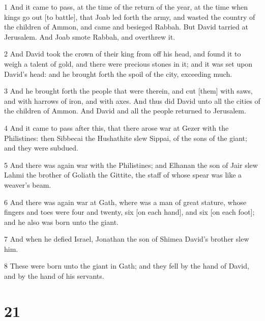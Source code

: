 \par 1 And it came to pass, at the time of the return of the year, at the time when kings go out [to battle], that Joab led forth the army, and wasted the country of the children of Ammon, and came and besieged Rabbah. But David tarried at Jerusalem. And Joab smote Rabbah, and overthrew it.
\par 2 And David took the crown of their king from off his head, and found it to weigh a talent of gold, and there were precious stones in it; and it was set upon David's head: and he brought forth the spoil of the city, exceeding much.
\par 3 And he brought forth the people that were therein, and cut [them] with saws, and with harrows of iron, and with axes. And thus did David unto all the cities of the children of Ammon. And David and all the people returned to Jerusalem.
\par 4 And it came to pass after this, that there arose war at Gezer with the Philistines: then Sibbecai the Hushathite slew Sippai, of the sons of the giant; and they were subdued.
\par 5 And there was again war with the Philistines; and Elhanan the son of Jair slew Lahmi the brother of Goliath the Gittite, the staff of whose spear was like a weaver's beam.
\par 6 And there was again war at Gath, where was a man of great stature, whose fingers and toes were four and twenty, six [on each hand], and six [on each foot]; and he also was born unto the giant.
\par 7 And when he defied Israel, Jonathan the son of Shimea David's brother slew him.
\par 8 These were born unto the giant in Gath; and they fell by the hand of David, and by the hand of his servants.

\chapter{21}

